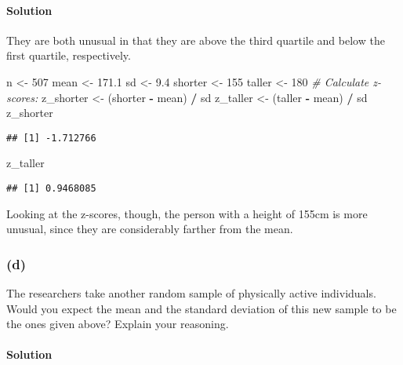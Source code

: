 \documentclass[]{article}
\newenvironment{Shaded}{\begin{snugshade}}{\end{snugshade}}
\newcommand{\DecValTok}[1]{\textcolor[rgb]{0.00,0.00,0.81}{#1}}
\newcommand{\FloatTok}[1]{\textcolor[rgb]{0.00,0.00,0.81}{#1}}
\newcommand{\StringTok}[1]{\textcolor[rgb]{0.31,0.60,0.02}{#1}}
\newcommand{\CommentTok}[1]{\textcolor[rgb]{0.56,0.35,0.01}{\textit{#1}}}
\newcommand{\OperatorTok}[1]{\textcolor[rgb]{0.81,0.36,0.00}{\textbf{#1}}}
\newcommand{\NormalTok}[1]{#1}
\let\oldparagraph\paragraph
\renewcommand{\paragraph}[1]{\oldparagraph{#1}\mbox{}}
\begin{document}
\paragraph{Solution}\label{solution-2}

They are both unusual in that they are above the third quartile and
below the first quartile, respectively.

\begin{Shaded}
\begin{Highlighting}[]
\NormalTok{n <-}\StringTok{ }\DecValTok{507}
\NormalTok{mean <-}\StringTok{ }\FloatTok{171.1}
\NormalTok{sd <-}\StringTok{ }\FloatTok{9.4}
\NormalTok{shorter <-}\StringTok{ }\DecValTok{155}
\NormalTok{taller <-}\StringTok{ }\DecValTok{180}
\CommentTok{# Calculate z-scores:}
\NormalTok{z_shorter <-}\StringTok{ }\NormalTok{(shorter }\OperatorTok{-}\StringTok{ }\NormalTok{mean) }\OperatorTok{/}\StringTok{ }\NormalTok{sd}
\NormalTok{z_taller <-}\StringTok{ }\NormalTok{(taller }\OperatorTok{-}\StringTok{ }\NormalTok{mean) }\OperatorTok{/}\StringTok{ }\NormalTok{sd}
\NormalTok{z_shorter}
\end{Highlighting}
\end{Shaded}

\begin{verbatim}
## [1] -1.712766
\end{verbatim}

\begin{Shaded}
\begin{Highlighting}[]
\NormalTok{z_taller}
\end{Highlighting}
\end{Shaded}

\begin{verbatim}
## [1] 0.9468085
\end{verbatim}

Looking at the z-scores, though, the person with a height of 155cm is
more unusual, since they are considerably farther from the mean.

\subsubsection{(d)}\label{d}

The researchers take another random sample of physically active
individuals. Would you expect the mean and the standard deviation of
this new sample to be the ones given above? Explain your reasoning.

\paragraph{Solution}\label{solution-3}
\end{document}
